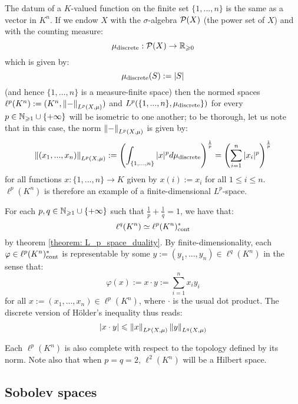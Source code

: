         \begin{example}
            The datum of a $K$-valued function on the finite set $\{1, ..., n\}$ is the same as a vector in $K^n$. If we endow $X$ with the $\sigma$-algebra $\mathcal{P}(X)$ (the power set of $X$) and with the counting measure:
                $$\mu_{\mathrm{discrete}}: \mathcal{P}(X) \to \mathbb{R}_{\geqslant 0}$$
            which is given by:
                $$\mu_{\mathrm{discrete}}(S) := |S|$$
            (and hence $\{1, ..., n\}$ is a measure-finite space) then the normed spaces $\ell^p(K^n) := (K^n, \left\| {-} \right\|_{L^p(X, \mu)})$ and $L^p(\{1, ..., n\}, \mu_{\mathrm{discrete}}\})$ for every $p \in \mathbb{N}_{\geqslant 1} \cup \{+\infty\}$ will be isometric to one another; to be thorough, let us note that in this case, the norm $\left\| {-} \right\|_{L^p(X, \mu)}$ is given by:
                $$\left\| {(x_1, ..., x_n)} \right\|_{L^p(X, \mu)} := \left( \int_{\{1, ..., n\}} |x|^p d\mu_{\mathrm{discrete}} \right)^{\frac1p} = \left( \sum_{i = 1}^n |x_i|^p \right)^{\frac1p}$$
            for all functions $x: \{1, ..., n\} \to K$ given by $x(i) := x_i$ for all $1 \leq i \leq n$. $\ell^p(K^n)$ is therefore an example of a finite-dimensional $L^p$-space.

            For each $p, q \in \mathbb{N}_{\geqslant 1} \cup \{+\infty\}$ such that $\frac1p + \frac1q = 1$, we have that:
                $$\ell^q(K^n) \simeq \ell^p(K^n)^*_{\mathrm{cont}}$$
            by theorem \ref{theorem: L_p_space_duality}. By finite-dimensionality, each $\varphi \in \ell^p(K^n)^*_{\mathrm{cont}}$ is representable by some $y := (y_1, ..., y_n) \in \ell^q(K^n)$ in the sense that:
                $$\varphi(x) := x \cdot y := \sum_{i = 1}^n x_i y_i$$
            for all $x := (x_1, ..., x_n) \in \ell^p(K^n)$, where $\cdot$ is the usual dot product. The discrete version of H\"older's inequality thus reads:
                $$\left\lvert {x \cdot y} \right\rvert \leqslant \left\| {x} \right\|_{L^p(X, \mu)} \left\| {y} \right\|_{L^q(X, \mu)}$$

            Each $\ell^p(K^n)$ is also complete with respect to the topology defined by its norm. Note also that when $p = q = 2$, $\ell^2(K^n)$ will be a Hilbert space.
        \end{example}

    \subsection{Sobolev spaces}